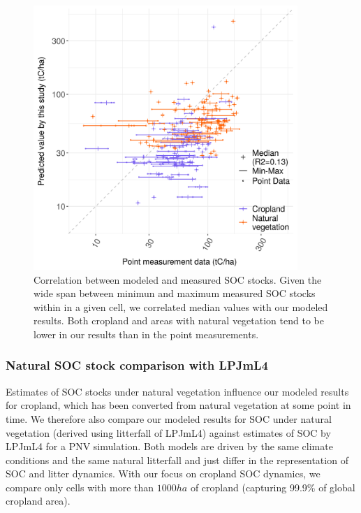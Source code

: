 \documentclass[gc, manuscript]{copernicus}
\begin{document}
\begin{figure}[h]
\includegraphics[width=10cm]{../ResultNotebooks/Output/Images/scatterComparePointData_2010} \caption{Correlation between modeled and measured SOC stocks. Given the wide span between minimun and maximum measured SOC stocks within in a given cell, we correlated median values with our modeled results. Both cropland and areas with natural vegetation tend to be lower in our results than in the point measurements.}\label{fig:SOCpoint}
\end{figure}

\hypertarget{natural-soc-stock-comparison-with-lpjml4}{%
\subsubsection{Natural SOC stock comparison with LPJmL4}\label{natural-soc-stock-comparison-with-lpjml4}}

Estimates of SOC stocks under natural vegetation influence our modeled results for cropland, which has been converted from natural vegetation at some point in time. We therefore also compare our modeled results for SOC under natural vegetation (derived using litterfall of LPJmL4) against estimates of SOC by LPJmL4 for a PNV simulation. Both models are driven by the same climate conditions and the same natural litterfall and just differ in the representation of SOC and litter dynamics. With our focus on cropland SOC dynamics, we compare only cells with more than \(1000\unit{ha}\) of cropland (capturing 99.9\% of global cropland area).
\end{document}
